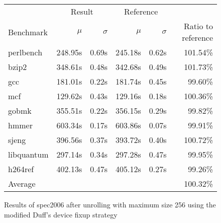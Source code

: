 \begin{figure}[bh]
    \begin{center}
        \begin{tabular}{lrrrrr}
            \toprule
            & \multicolumn{2}{c}{Result} & \multicolumn{2}{c}{Reference}\\
            Benchmark & $\mu$ & $\sigma$ & $\mu$ & $\sigma$ & Ratio to reference\\
            \midrule
            perlbench & 248.95s & 0.69s & 245.18s & 0.62s & 101.54\%\\
            bzip2 & 348.61s & 0.48s & 342.68s & 0.49s & 101.73\%\\
            gcc & 181.01s & 0.22s & 181.74s & 0.45s & 99.60\%\\
            mcf & 129.62s & 0.43s & 129.16s & 0.18s & 100.36\%\\
            gobmk & 355.51s & 0.22s & 356.15s & 0.29s & 99.82\%\\
            hmmer & 603.34s & 0.17s & 603.86s & 0.07s & 99.91\%\\
            sjeng & 396.56s & 0.37s & 393.72s & 0.40s & 100.72\%\\
            libquantum & 297.14s & 0.34s & 297.28s & 0.47s & 99.95\%\\
            h264ref & 402.13s & 0.47s & 405.12s & 0.27s & 99.26\%\\
            \midrule
            Average & & & & & 100.32\%\\
            \bottomrule
        \end{tabular}
    \end{center}
    \caption{Results of spec2006 after unrolling with maximum size 256 using the modified Duff's device fixup strategy}
    \label{fig:eval:perf:duff:256}
\end{figure}
